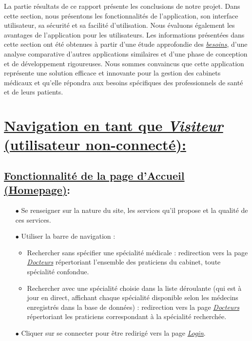 \documentclass[a4paper]{report}
\begin{document}
La partie résultats de ce rapport présente les conclusions de notre projet. Dans cette section, nous présentons les fonctionnalités de l'application, son interface utilisateur, sa sécurité et sa facilité d'utilisation. Nous évaluons également les avantages de l'application pour les utilisateurs. Les informations présentées dans cette section ont été obtenues à partir d'une étude approfondie des \textit{\hyperref[besoins]{besoins}}, d'une analyse comparative d'autres applications similaires et d'une phase de conception et de développement rigoureuses. Nous sommes convaincus que cette application représente une solution efficace et innovante pour la gestion des cabinets médicaux et qu'elle répondra aux besoins spécifiques des professionnels de santé et de leurs patients.
\newline
\newline

\section{\underline{\noindent Navigation en tant que \textit{Visiteur} {\fontsize{12}{16}\selectfont(utilisateur non-connecté)}: }}
\vspace{0.8cm}

\subsection{\underline{Fonctionnalité de la page d'Accueil (Homepage)}:}
    \begin{itemize}
        \item[$\bullet$] Se renseigner sur la nature du site, les services qu’il propose et la qualité de ces services.
        \item[$\bullet$] Utiliser la barre de navigation :
        \begin{itemize}
            \item Rechercher sans spécifier une spécialité médicale : redirection vers la page \textit{\hyperref[docteurs]{Docteurs}} répertoriant l’ensemble des praticiens du cabinet, toute spécialité confondue.
            \item Rechercher avec une spécialité choisie dans la liste déroulante (qui est à jour en direct, affichant chaque spécialité disponible selon les médecins enregistrés dans la base de données) : redirection vers la page \textit{\hyperref[docteurs]{Docteurs}} répertoriant les praticiens correspondant à la spécialité recherchée.
        \end{itemize}
        \item[$\bullet$] Cliquer sur se connecter pour être redirigé vers la page \textit{\hyperref[login]{Login}}.
    \end{itemize}
    \vspace{3mm}
\end{document}
